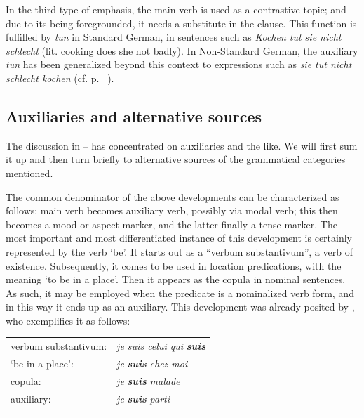 \label{page35}In the third type of emphasis, the main verb is used as a contrastive topic; and due to its being foregrounded, it needs a substitute in the clause. This function is fulfilled by \textit{tun} in Standard German, in sentences such as \textit{Kochen tut sie nicht schlecht} (lit. cooking does she not badly). In Non-Standard German, the auxiliary \textit{tun} has been generalized beyond this context to expressions such as \textit{sie tut nicht schlecht kochen} (cf. p.~\pageref{page123}\chk%
).

\subsection{Auxiliaries and alternative sources} \label{sec:3.1.6}

The discussion in -- has concentrated on auxiliaries and the like. We will first sum it up and then turn briefly to alternative sources of the grammatical categories mentioned.

The common denominator of the above developments can be characterized as follows: main verb becomes auxiliary verb, possibly via modal verb; this then becomes a mood or aspect marker, and the latter finally a tense marker. The most important and most differentiated instance of this development is certainly represented by the verb ‘be’. It starts out as a ``verbum substantivum'', a verb of existence. Subsequently, it comes to be used in location predications, with the meaning ‘to be in a place’. Then it appears as the copula in nominal sentences. As such, it may be employed when the predicate is a nominalized verb form, and in this way it ends up as an auxiliary. This development was already posited by \citet[131]{Meillet1912}, who exemplifies it as follows:

\begin{table}
\begin{tabular}{ll}
\lsptoprule
verbum substantivum: & \textit{je suis celui qui }\textbf{\textit{suis}}\\
‘be in a place’: & \textit{je }\textbf{\textit{suis}}\textit{ chez moi}\\
copula: & \textit{je }\textbf{\textit{suis}}\textit{ malade}\\
auxiliary: & \textit{je }\textbf{\textit{suis}}\textit{ parti}\\
\lspbottomrule
\end{tabular}
\end{table}

